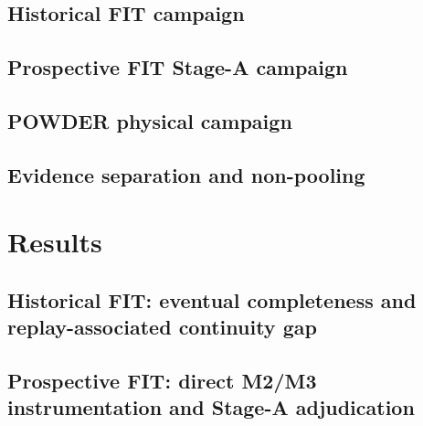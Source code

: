 \documentclass[journal]{IEEEtran}
\begin{document}
\subsection{Historical FIT campaign}

\subsection{Prospective FIT Stage-A campaign}

\subsection{POWDER physical campaign}

\subsection{Evidence separation and non-pooling}

\section{Results}
\label{sec:results}

\subsection{Historical FIT: eventual completeness and replay-associated continuity gap}

\subsection{Prospective FIT: direct M2/M3 instrumentation and Stage-A adjudication}
\end{document}
